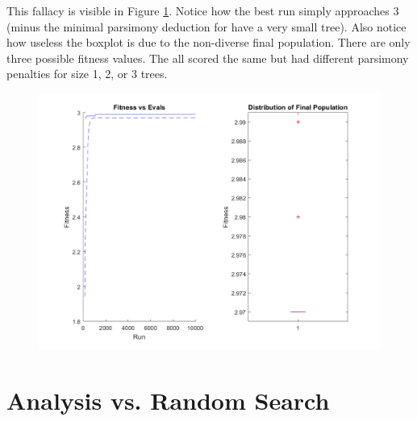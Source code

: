 \documentclass[11pt]{article}
\begin{document}
This fallacy is visible in Figure \ref{fig:default}. Notice how the best run simply approaches 3 (minus the minimal parsimony deduction for have a very small tree). Also notice how useless the boxplot is due to the non-diverse final population. There are only three possible fitness values. The all scored the same but had different parsimony penalties for size 1, 2, or 3 trees.

\begin{figure}[h]
\centering
\includegraphics[width=6in]{default.png}
\label{fig:default}
\end{figure}

\section{Analysis vs. Random Search}\label{sect:analysis}
\end{document}
